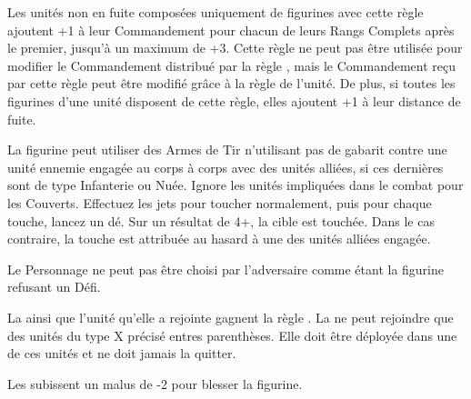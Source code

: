\newcommand{\cauldronofblightrule}{%
Si le \plaguepriest est un Sorcier, il ne choisit pas ses sorts aléatoirement mais connaît toujours les trois sorts suivants: \diseasetwo{} (Discipline \disease{}), \diseasethree{} (Discipline \disease{}) et \ruintwo{} (Discipline \ruin{}). Ces sorts doivent rester uniques dans l'armée.
}












\startarmyspecialrules

\armyspecialruleentry{\safetyinnumbers}

Les unités non en fuite composées uniquement de figurines avec cette règle ajoutent +1 à leur Commandement pour chacun de leurs Rangs Complets après le premier, jusqu'à un maximum de +3. Cette règle ne peut pas être utilisée pour modifier le Commandement distribué par la règle \inspiringpresence{}, mais le Commandement reçu par cette règle peut être modifié grâce à la règle \safetyinnumbers{} de l'unité. De plus, si toutes les figurines d'une unité disposent de cette règle, elles ajoutent +1 à leur distance de fuite.


\armyspecialruleentry{\callous}

La figurine peut utiliser des Armes de Tir n'utilisant pas de gabarit contre une unité ennemie engagée au corps à corps avec des unités alliées, si ces dernières sont de type Infanterie ou Nuée. Ignore les unités impliquées dans le combat pour les Couverts. Effectuez les jets pour toucher normalement, puis pour chaque touche, lancez un dé. Sur un résultat de 4+, la cible est touchée. Dans le cas contraire, la touche est attribuée au hasard à une des unités alliées engagée.


\armyspecialruleentry{\honourless}

Le Personnage ne peut pas être choisi par l'adversaire comme étant la figurine refusant un Défi.



La \warplatform{} ainsi que l'unité qu'elle a rejointe gagnent la règle \immunetopsychology{}. La \warplatform{} ne peut rejoindre que des unités du type X précisé entres parenthèses. Elle doit être déployée dans une de ces unités et ne doit jamais la quitter.


\armyspecialruleentry{\resistant}

Les \toxicattacks{} subissent un malus de -2 pour blesser la figurine.


